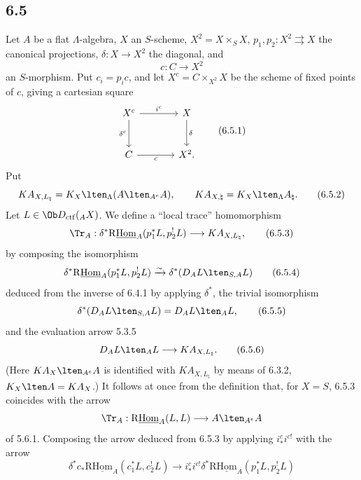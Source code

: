 \subsection*{6.5}
Let $A$ be a flat $\Lambda$-algebra, $X$ an $S$-scheme, $X^2=X\times_SX$, $p_1,p_2:X^2\rightrightarrows X$ the canonical projections, $\delta:X\to X^2$ the diagonal, and
\[
c:C\longrightarrow X^2
\]
an $S$-morphism. Put $c_i=p_ic$, and let $X^c=C\times_{X^2}X$ be the scheme of fixed points of $c$, giving a cartesian square
\begin{equation}
\begin{tikzcd}[column sep=large,row sep=large]
X^c \arrow[r,"i^c"] \arrow[d,"\delta^c"'] & X \arrow[d,"\delta"]\\
C \arrow[r,"c"'] & X^2 .
\end{tikzcd}
\tag{6.5.1}
\end{equation}
Put
\begin{equation}
KA_{X,L_{\natural}}=K_X\lten_{\Lambda}(A\lten_{A^e}A),
\qquad
KA_{X,\natural}=K_X\lten_{\Lambda}A_{\natural}.
\tag{6.5.2}
\end{equation}
Let $L\in\Ob D_{\mathrm{ctf}}({}_AX)$. We define a “local trace” homomorphism
\begin{equation}
\Tr_A:\delta^*\mathrm{R}\underline{\mathrm{Hom}}_A(p_1^*L,p_2^!L)
\longrightarrow
KA_{X,L_{\natural}},
\tag{6.5.3}
\end{equation}
by composing the isomorphism
\begin{equation}
\delta^*\mathrm{R}\underline{\mathrm{Hom}}_A(p_1^*L,p_2^!L)
\xrightarrow{\sim}
\delta^*(D_AL\lten_{S,A}L)
\tag{6.5.4}
\end{equation}
deduced from the inverse of 6.4.1 by applying $\delta^*$, the trivial isomorphism
\begin{equation}
\delta^*(D_AL\lten_{S,A}L)=D_AL\lten_AL,
\tag{6.5.5}
\end{equation}
and the evaluation arrow 5.3.5
\begin{equation}
D_AL\lten_AL\longrightarrow KA_{X,L_{\natural}}.
\tag{6.5.6}
\end{equation}
(Here $KA_X\lten_{A^e}A$ is identified with $KA_{X,L_{\natural}}$ by means of 6.3.2, $K_X\lten A=KA_X$.)
It follows at once from the definition that, for $X=S$, 6.5.3 coincides with the arrow
\[
\Tr_A:\mathrm{R}\underline{\mathrm{Hom}}_A(L,L)\longrightarrow A\lten_{A^e}A
\]
of 5.6.1. Composing the arrow deduced from 6.5.3 by applying $i_*^ci^{c!}$ with the arrow
\begin{equation}
\delta^*c_*\mathrm{R}\underline{\mathrm{Hom}}_A(c_1^*L,c_2^!L)
\longrightarrow
i_*^ci^{c!}\delta^*\mathrm{R}\underline{\mathrm{Hom}}_A(p_1^*L,p_2^!L)
\tag{6.5.7}
\end{equation}
